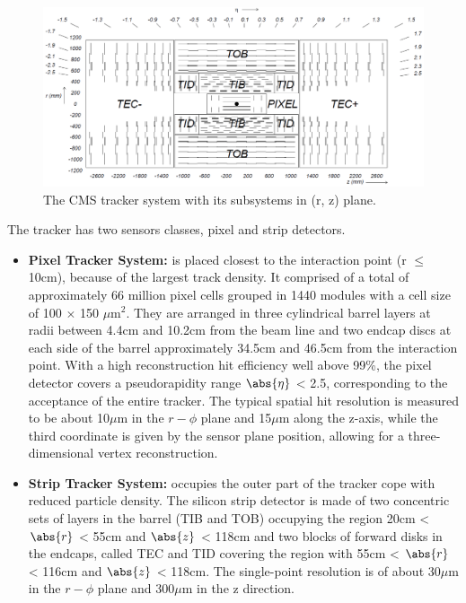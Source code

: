\begin{figure}[h!]
\centering
\includegraphics[scale=0.3]{fig/chapt3/Tracker.png}
\caption{\label{fig:tracker} The CMS tracker system with its subsystems in (r, z) plane.}
\end{figure}
The tracker has two sensors classes,  pixel and strip detectors.
\begin{itemize}
\item{\textbf{Pixel Tracker System:}} is placed closest to the interaction point (r $\leq$ 10cm), because of the largest track density. It comprised of a total of approximately 66 million pixel cells grouped in 1440 modules with a cell size of 100 $\times$ 150 $\mu$m$^{2}$. They are arranged in three cylindrical barrel layers at radii between 4.4cm and 10.2cm from the beam line and two endcap discs at each side of the barrel approximately 34.5cm and 46.5cm from the interaction point. With a high reconstruction hit efficiency well above 99\%, the pixel detector covers a pseudorapidity range $\abs{\eta}$ < 2.5, corresponding to the acceptance of the entire tracker. The typical spatial hit resolution is measured to be about 10$\mu$m in the $r-\phi$ plane and 15$\mu$m along the z-axis, while the third coordinate is given by the sensor plane position, allowing for a three-dimensional vertex reconstruction.
\item{\textbf{Strip Tracker System:}} occupies the outer part of the tracker cope with reduced particle density. The silicon strip detector is made of two concentric sets of layers in the barrel (TIB and TOB) occupying the region 20cm < $\abs{r}$ < 55cm and $\abs{z}$ < 118cm and two blocks of forward disks in the endcaps, called TEC and TID covering the region with 55cm < $\abs{r}$ < 116cm and $\abs{z}$ < 118cm.  The single-point resolution is of about 30$\mu$m in the $r-\phi$ plane and 300$\mu$m in the z direction.
\end{itemize} 

